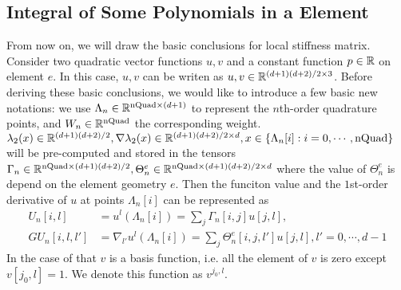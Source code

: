 \subsection{Integral of Some Polynomials in a Element}
From now on, we will draw the basic conclusions for local stiffness matrix. 
Consider two quadratic vector functions $u,v$ and a constant function $p\in\mathbb{R}$ on element $e$.
In this case, $u,v$ can be writen as $u,v\in\mathbb{R}^{(d+1)(d+2)/2\times3}$.
Before deriving these basic conclusions, we would like to introduce a few basic new notations:
we use $\Lambda_n\in\mathbb{R}^{\text{nQuad}\times (d+1)}$ to represent the $n$th-order quadrature points, 
and $W_n\in\mathbb{R}^{\text{nQuad}}$ the corresponding weight.
$\lambda_2(x)\in\mathbb{R}^{(d+1)(d+2)/2},
\nabla \lambda_2(x)\in\mathbb{R}^{(d+1)(d+2)/2\times d},
x\in\{\Lambda_n[i]:i=0,\cdots,\text{nQuad}\}$ 
will be pre-computed and stored in the tensors 
$\Gamma_n\in\mathbb{R}^{\text{nQuad}\times(d+1)(d+2)/2},
\Theta_n^e\in\mathbb{R}^{\text{nQuad}\times(d+1)(d+2)/2\times d}$
where the value of $\Theta^e_n$ is depend on the element geometry $e$.
Then the funciton value and the $1$st-order derivative of $u$ at points $\Lambda_n[i]$ can be represented as
\[
  \begin{split}
        U_n[i,l] &= u^l(\Lambda_n[i])=\sum_j \Gamma_n[i,j]u[j,l], \\
    GU_n[i,l,l'] &= \nabla_{l'} u^l(\Lambda_n[i])=\sum_j \Theta_n^e[i,j,l']u[j,l],
    l'=0,\cdots,d-1
  \end{split}
\]
In the case of that $v$ is a basis function, i.e. all the element of 
$v$ is zero except $v[j_0,l]=1$.
We denote this function as $v^{j_0,l}$.
